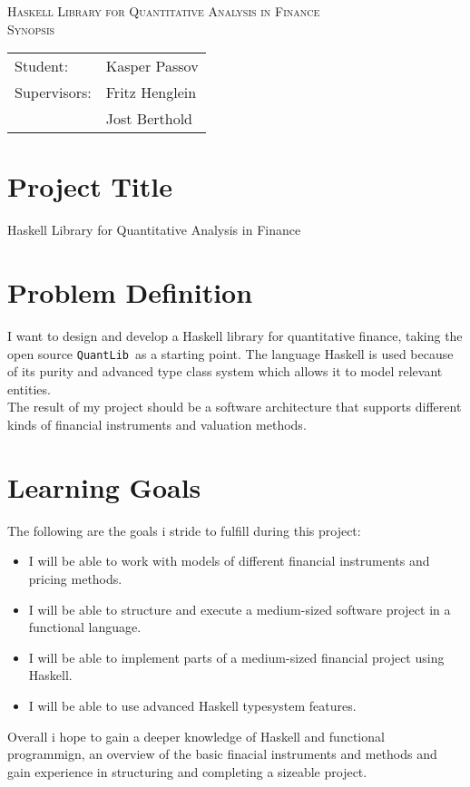 \documentclass{article}
\newcommand{\QL}{\texttt{QuantLib}}
\begin{document}
\begin{titlepage}
\begin{center}
\textsc{\huge Haskell Library for Quantitative Analysis in Finance}\\[0.5cm]
\textsc{\Large Synopsis}\\[0.5cm]
\vspace{2 cm}
\begin{tabular}{ll}
Student: & Kasper Passov\\
Supervisors: & Fritz Henglein \\ 
             & Jost Berthold
\end{tabular}
\end{center}
\vspace{5 cm}
\newpage
\tableofcontents
\end{titlepage}

\section{Project Title}
Haskell Library for Quantitative Analysis in Finance

\section{Problem Definition}

I want to design and develop a Haskell library for 
quantitative finance, taking the open source \QL\ 
as a starting point. The language Haskell is used
because of its purity and advanced type class system
which allows it to model relevant entities.\\
The result of my project should be a software
architecture that supports different kinds of 
financial instruments and valuation methods.

\section{Learning Goals}
The following are the goals i stride to fulfill during this project:
\begin{itemize}
    \item {I will be able to work with models of different financial instruments and pricing methods.}
    \item {I will be able to structure and execute a medium-sized software project in a functional language.}
    \item {I will be able to implement parts of a medium-sized financial project using Haskell.}
    \item {I will be able to use advanced Haskell typesystem features.}
\end{itemize}
Overall i hope to gain a deeper knowledge of Haskell and functional programmign, an overview of the basic finacial instruments
and methods and gain experience in structuring and completing a sizeable project.
\end{document}
